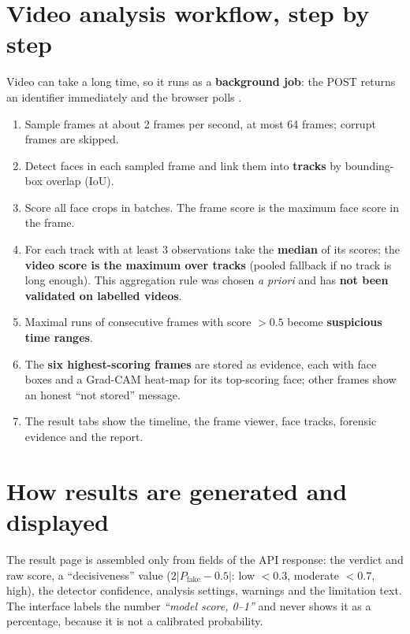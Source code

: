 \documentclass[11pt,a4paper]{report}
\newcommand{\code}[1]{\texttt{\detokenize{#1}}}
\newcommand{\pfake}{\ensuremath{P_{\mathrm{fake}}}}
\begin{document}
\section{Video analysis workflow, step by step}
Video can take a long time, so it runs as a \textbf{background job}: the POST returns an identifier immediately and the browser polls \code{/status}.
\begin{enumerate}
\item Sample frames at about 2 frames per second, at most 64 frames; corrupt frames are skipped.
\item Detect faces in each sampled frame and link them into \textbf{tracks} by bounding-box overlap (IoU).
\item Score all face crops in batches. The frame score is the maximum face score in the frame.
\item For each track with at least 3 observations take the \textbf{median} of its scores; the \textbf{video score is the maximum over tracks} (pooled fallback if no track is long enough). This aggregation rule was chosen \emph{a priori} and has \textbf{not been validated on labelled videos}.
\item Maximal runs of consecutive frames with score $>0.5$ become \textbf{suspicious time ranges}.
\item The \textbf{six highest-scoring frames} are stored as evidence, each with face boxes and a Grad-CAM heat-map for its top-scoring face; other frames show an honest ``not stored'' message.
\item The result tabs show the timeline, the frame viewer, face tracks, forensic evidence and the report.
\end{enumerate}

\section{How results are generated and displayed}
The result page is assembled only from fields of the API response: the verdict and raw score, a ``decisiveness'' value ($2|\pfake-0.5|$: low $<0.3$, moderate $<0.7$, high), the detector confidence, analysis settings, warnings and the limitation text.
The interface labels the number \emph{``model score, 0--1''} and never shows it as a percentage, because it is not a calibrated probability.
\end{document}
